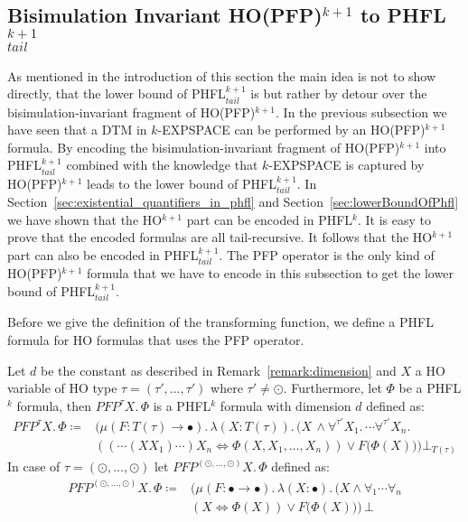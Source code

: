 \subsection{Bisimulation Invariant HO(PFP)$^{k+1}$ to PHFL$^{k+1}_{tail}$}\label{subsec:bisimulationInvariantHopfptoPhfl}

As mentioned in the introduction of this section the main idea is not to show directly, that the 
lower bound of PHFL$^{k+1}_{tail}$ is  but rather by detour over the 
bisimulation-invariant fragment of HO(PFP)$^{k+1}$. In the previous subsection we have seen 
 that a DTM in $k$-EXPSPACE can be performed by an HO(PFP)$^{k+1}$
formula. By encoding the bisimulation-invariant fragment of HO(PFP)$^{k+1}$ into
PHFL$^{k+1}_{tail}$ combined with the knowledge that $k$-EXPSPACE is captured by 
HO(PFP)$^{k+1}$ leads to the lower bound of PHFL$^{k+1}_{tail}$. In
Section~\ref{sec:existential_quantifiers_in_phfl} and Section~\ref{sec:lowerBoundOfPhfl} we 
have shown that the HO$^{k+1}$ part can be encoded in PHFL$^k$. It is easy to prove that the 
encoded formulas are all tail-recursive. It follows that the HO$^{k+1}$ part can also be 
encoded in  PHFL$^{k+1}_{tail}$. The PFP operator is the only kind of HO(PFP)$^{k+1}$ formula 
that we have to encode in this subsection to get the lower bound of PHFL$^{k+1}_{tail}$.

Before we give the definition of the transforming function, we define a PHFL formula for HO formulas that uses the PFP operator.

\begin{definition}
Let $d$ be the constant as described in Remark~\ref{remark:dimension} and $X$ a HO variable of HO type $\tau = (\tau', \dots, \tau')$ where $\tau' \neq \odot$. Furthermore, let
    $\Phi$ be a PHFL$^k$
    formula, then $PFP^\tau X.\,\Phi$
    is a PHFL$^k$ formula with dimension $d$ defined as:
    \begin{align*}
     PFP^\tau X. \, \Phi \coloneqq &\Big(\mu (F \colon T(\tau) \rightarrow \bullet).\,\lambda (X \colon T(\tau)).\, \big(X\,\wedge \forall^{\tau'}X_1.\, \dotsb \forall^{\tau'}X_n.\, \\&( (\dotsb (X X_1) \dotsb) X_n \Leftrightarrow \Phi(X, X_1, \dots, X_n) ) \vee F(\Phi(X)\big)\Big)\bot_{T(\tau)}
\end{align*}    
    In case of $\tau = (\odot, \dots, \odot)$ let $PFP^{(\odot, \dots, \odot)} X.\,\Phi$ defined as:
    \begin{align*}
    PFP^{(\odot, \dots, \odot)} X.\,\Phi \coloneqq & \Big(\mu (F \colon \bullet \rightarrow \bullet).\,\lambda (X \colon \bullet).\, \big(X \wedge \forall_1 \dotsb \forall_n \\&(X \Leftrightarrow \Phi(X)) \vee F(\Phi(X)\big)\Big)\,\bot 
    \end{align*}
\end{definition}

